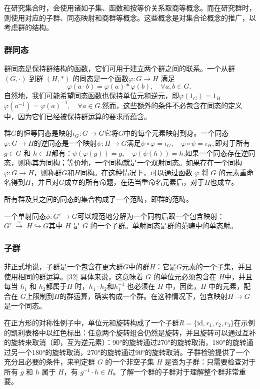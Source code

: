 在研究集合时，会使用诸如子集、函数和按等价关系取商等概念。而在研究群时，则使用对应的子群、同态映射和商群等概念。这些概念是对集合论概念的推广，以考虑群的结构。
\subsubsection{群同态}  
群同态是保持群结构的函数，它们可用于建立两个群之间的联系。一个从群 \((G, \cdot)\) 到群 \((H, *)\) 的同态是一个函数\(\varphi: G \to H\)
满足  
\[
\varphi(a \cdot b) = \varphi(a) * \varphi(b), \quad \forall a, b \in G.~
\]
自然地，我们可能希望同态函数也保持单位元和逆元，即\(\varphi(1_G) = 1_H\)\(\varphi(a^{-1}) = \varphi(a)^{-1}, \quad \forall a \in G.\)然而，这些额外的条件不必包含在同态的定义中，因为它们已经被保持群运算的要求所蕴含。

群\(G\)的恒等同态是映射\(\iota_G: G \to G\)它将\( G\)中的每个元素映射到身。一个同态\(\varphi:G\to H\)的逆同态是一个映射\(\psi:H\to G\)满足\(\psi \circ\varphi = \iota_G,\quad \varphi \circ \psi = \iota_H,\)即对于所有\( g \in G \) 和 \( h \in H \)都有：\(\psi(\varphi(g)) = g, \quad \varphi(\psi(h)) = h\).如果一个同态存在逆同态，则称其为同构；等价地，一个同构就是一个双射同态。如果存在一个同构\( \varphi: G \to H \)，则称群\(G\)和\( H \)同构。在这种情况下，可以通过函数 \( \varphi \) 将 \( G \) 的元素重命名得到\( H \)，并且对\( G \)成立的所有命题，在适当重命名元素后，对于\(H\)也成立。

所有群及其之间的同态的集合构成了一个范畴，即群的范畴。  

一个单射同态\(\phi:G'\to G\)可以规范地分解为一个同构后跟一个包含映射：\(G' \; {\stackrel{\sim}{\to}} \; H \hookrightarrow G\)其中 \( H \) 是 \( G \) 的一个子群。单射同态是群的范畴中的单态射。
\subsubsection{子群}  
非正式地说，子群是一个包含在更大群\( G \)中的群\( H \)：它是\( G \)元素的一个子集，并且使用相同的群运算。[32] 具体来说，这意味着 \( G \) 的单位元必须包含在 \( H \)中，并且每当 \( h_1 \) 和 \( h_2 \)都属于\( H \) 时，\(h_1 \cdot h_2 \)和\( h_1^{-1} \) 也必须在 \( H \) 中，因此，\( H \) 中的元素，配合在 \( G \)上限制到\( H \)的群运算，确实构成一个群。在这种情况下，包含映射\( H \to G \)是一个同态。

在正方形的对称性例子中，单位元和旋转构成了一个子群\(R = \{\text{id}, r_1, r_2, r_3\}\)在示例的凯利表格中以红色标出：任意两个旋转组合仍然是旋转，并且旋转可以通过互补的旋转来取消（即，互为逆元素）：90°的旋转通过270°的旋转取消，180°的旋转通过另一个180°的旋转取消，270°的旋转通过90°的旋转取消。子群检验提供了一个充分且必要的条件，来判定群 \( G \) 的一个非空子集 \( H \) 是否为子群：只需要检查对于所有 \( g \) 和 \( h \) 属于 \( H \)，有 \( g^{-1} \cdot h \in H \)。了解一个群的子群对于理解整个群非常重要。

